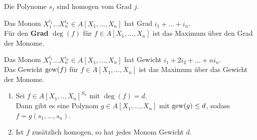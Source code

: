 	\begin{satz}
		Die Polynome $s_j$ sind homogen vom Grad $j$.\\
	\end{satz}

	\begin{definition}
		Das Monom $X_1^{i_1}...X_n^{i_n}\in A[X_1,...,X_n]$ hat Grad $i_1+...+i_n$.\\
		Für den \textbf{Grad} $\deg(f)$ für $f\in A[X_1,...,X_n]$ ist das Maximum über den Grad der Monome.
	\end{definition}

	\begin{definition}
		Das Monom $X_1^{i_1}...X_n^{i_n}\in A[X_1,...,X_n]$ hat Gewicht $i_1+2i_2+...+ni_n$.\\
		Das Gewicht $\operatorname{gew}(f)$ für $f\in A[X_1,...,X_n]$ ist das Maximum über das Gewicht der Monome.
	\end{definition}

	\begin{theorem}
		\begin{enumerate}
			\item Sei $f\in A[X_1,..,X_n]^{S_n}$ mit  $\deg(f)=d$.\\
			Dann gibt es eine Polynom $g\in A[X_1,...,X_n]$ mit $\operatorname{gew}(g)\leq d$, sodass $f=g(s_1,...,s_n)$.\\
			\item Ist $f$ zusätzlich homogen, so hat jedes Monom Gewicht $d$.
		\end{enumerate}

	\end{theorem}

